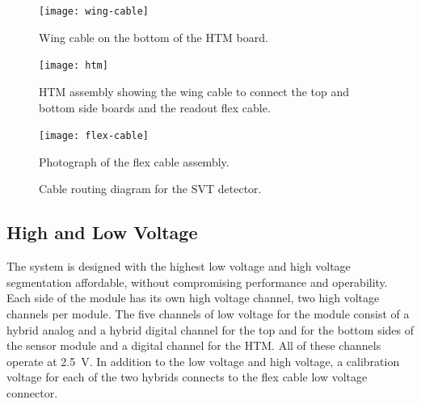 \begin{figure}[htbp]
\centering
\texttt{[image: wing-cable]}
\caption{\small{Wing cable on the bottom of the HTM board.}}
\label{fig:wing-cable}
\end{figure}

\begin{figure}[htbp]
\centering
\texttt{[image: htm]}
\caption{\small{HTM assembly showing the wing cable to connect the top
and bottom side boards and the readout flex cable.}}
\label{fig:htm}
\end{figure}

\begin{figure}[htbp]
\centering
\texttt{[image: flex-cable]}
\caption{\small{Photograph of the flex cable assembly.}}
\label{fig:flex-cable}
\end{figure}

\begin{figure}[htbp]
\vspace{8.5cm}
\caption{\small{Cable routing diagram for the SVT detector.}}
\label{routing}
\end{figure}

\subsection{High and Low Voltage}

The system is designed with the highest low voltage and high voltage 
segmentation affordable, without compromising performance and operability.
Each side of the module has its own high voltage channel, two high voltage 
channels per module.  The five channels of low voltage for the module 
consist of a hybrid analog and a hybrid digital channel for the top and 
for the bottom sides of the sensor module and a digital channel for the HTM.
All of these channels operate at 2.5~V.  In addition to the low voltage and 
high voltage, a calibration voltage for each of the two hybrids connects to 
the flex cable low voltage connector.

